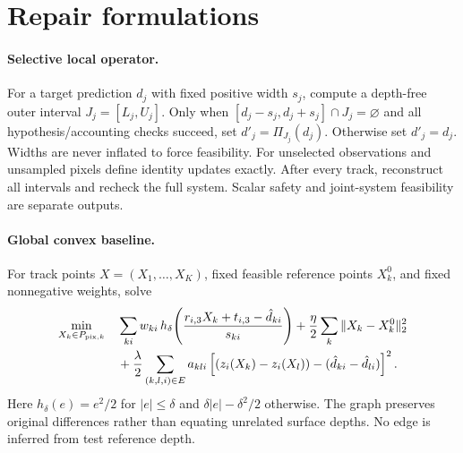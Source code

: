 \documentclass[11pt]{article}
\begin{document}
\section*{Repair formulations}
\paragraph{Selective local operator.}
For a target prediction $d_j$ with fixed positive width $s_j$, compute a depth-free outer interval $J_j=[L_j,U_j]$. Only when $[d_j-s_j,d_j+s_j]\cap J_j=\varnothing$ and all hypothesis/accounting checks succeed, set $d'_j=\Pi_{J_j}(d_j)$. Otherwise set $d'_j=d_j$. Widths are never inflated to force feasibility. For unselected observations and unsampled pixels define identity updates exactly. After every track, reconstruct all intervals and recheck the full system. Scalar safety and joint-system feasibility are separate outputs.

\paragraph{Global convex baseline.}
For track points $X=(X_1,\ldots,X_K)$, fixed feasible reference points $X^0_k$, and fixed nonnegative weights, solve
\begin{align*}
\min_{X_k\in P_{{\rm pix},k}}\quad&\sum_{ki}w_{ki}\,h_\delta\!\left(\frac{r_{i,3}X_k+t_{i,3}-\hat d_{ki}}{s_{ki}}\right)
+\frac\eta2\sum_k\|X_k-X^0_k\|_2^2\\
&+\frac\lambda2\sum_{(k,l,i)\in E}a_{kli}\left[(z_i(X_k)-z_i(X_l))-(\hat d_{ki}-\hat d_{li})\right]^2.
\end{align*}
Here $h_\delta(e)=e^2/2$ for $|e|\le\delta$ and $\delta|e|-\delta^2/2$ otherwise. The graph preserves original differences rather than equating unrelated surface depths. No edge is inferred from test reference depth.
\end{document}
